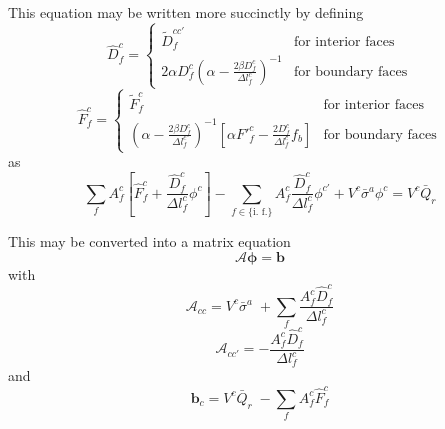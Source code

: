 \documentclass{article}
\newcommand{\bfunc}{\ensuremath{f_{b}}}
\begin{document}
This equation may be written more succinctly by defining
\begin{equation}
  \boxed{
        \hat{D}^{c}_{f}
               = \left\{
                     \begin{array}{ll}
                        \tilde{D}^{cc'}_{f}
                        & \text{for interior faces} \\
                        2\alpha D^{c}_{f}
                           \left( \alpha - \frac{2 \beta D^{c}_{f}}{\Delta l^{c}_{f}}
                           \right)^{-1}
                        & \text{for boundary faces}
                     \end{array}
                    \right.
   }
\end{equation}
\begin{equation}
   \boxed{
        \hat{F}^{c}_{f}
             =  \left\{
                     \begin{array}{ll}
                        \tilde{F}^{c}_{f}
                        & \text{for interior faces} \\
                           \left( \alpha - \frac{2 \beta D^{c}_{f}}{\Delta l^{c}_{f}}
                           \right)^{-1}
                        \left[ \alpha {F'}^{c}_{f}
                                 - \frac{2 D^{c}_{f}}{\Delta l^{c}_{f}} \bfunc
                        \right]
                        & \text{for boundary faces}
                     \end{array}
                    \right.
  }
\end{equation}
as
\begin{equation}
        \sum_{f} A^{c}_{f}
             \left[
                 \hat{F}^{c}_{f}
                         + \frac{\hat{D}^{c}_{f}}{\Delta l^{c}_{f}}  \phi^{c}
             \right]
        - \sum_{f \in \{\text{i.\ f.}\}}
                A^{c}_{f} \frac{\hat{D}^{c}_{f}}{\Delta l^{c}_{f}} \phi^{c'}
        + V^{c} \bar{\sigma}^{a} \phi^{c}
                = V^{c} \bar{Q}_{r}
\end{equation}

This may be converted into a matrix equation
\begin{equation}
        \mathcal{A} \boldsymbol{\phi} = \mathbf{b}
\end{equation}
with
\begin{equation}
   \boxed{
        \mathcal{A}_{cc} = V^{c} \bar{\sigma}^{a} \;
                + \sum_{f}
                        \frac{A^{c}_{f} \hat{D}^{c}_{f}}{\Delta l^{c}_{f}}
   }
\end{equation}
\begin{equation}
   \boxed{
        \mathcal{A}_{cc'} =
                 - \frac{A^{c}_{f} \hat{D}^{c}_{f}}{\Delta l^{c}_{f}}
   }
\label{eq:Accp}
\end{equation}
and
\begin{equation}
   \boxed{
        \mathbf{b}_{c} = V^{c} \bar{Q}_{r} \;
                - \sum_{f} A^{c}_{f} \hat{F}^{c}_{f}
   }
\end{equation}
\end{document}
